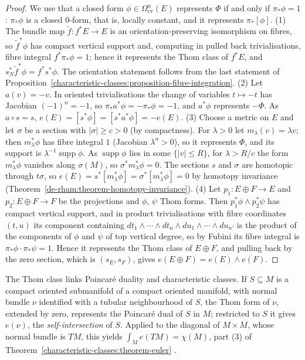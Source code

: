 \begin{proof}
We use that a closed form $\phi \in \Omega^n_{\mathrm{cv}}(E)$ represents $\Phi$ if and only if $\pi_*\phi = 1$: $\pi_*\phi$ is a closed $0$-form, that is, locally constant, and it represents $\pi_*[\phi]$. (1) The bundle map
$\tilde f \colon f^*E \to E$ is an orientation-preserving isomorphism on fibres, so $\tilde f^*\phi$ has compact vertical support and, computing in pulled back trivialisations, fibre integral $f^*\pi_*\phi = 1$; hence it represents
the Thom class of $f^*E$, and $s_N^*\tilde f^*\phi = f^*s^*\phi$. The orientation statement follows from the last statement of Proposition~\ref{characteristic-classes:proposition-fibre-integration}.
(2) Let $a(v) = -v$. In oriented trivialisations the change of variables $t \mapsto -t$ has Jacobian $(-1)^n = -1$, so $\pi_*a^*\phi = -\pi_*\phi = -1$, and $a^*\phi$ represents $-\Phi$. As $a \circ s = s$,
$e(E) = [s^*\phi] = [s^*a^*\phi] = -e(E)$.
(3) Choose a metric on $E$ and let $\sigma$ be a section with $|\sigma| \geq c > 0$ (by compactness). For $\lambda > 0$ let $m_\lambda(v) = \lambda v$; then $m_\lambda^*\phi$ has fibre integral $1$ (Jacobian $\lambda^n > 0$), so it represents $\Phi$, and its support is
$\lambda^{-1}\operatorname{supp}\phi$. As $\operatorname{supp}\phi$ lies in some $\{|v| \leq R\}$, for $\lambda > R/c$ the form $m_\lambda^*\phi$ vanishes along $\sigma(M)$, so $\sigma^*m_\lambda^*\phi = 0$. The sections $s$ and $\sigma$ are homotopic
through $t\sigma$, so $e(E) = s^*[m_\lambda^*\phi] = \sigma^*[m_\lambda^*\phi] = 0$ by homotopy invariance (Theorem~\ref{de-rham:theorem-homotopy-invariance}).
(4) Let $p_1 \colon E \oplus F \to E$ and $p_2 \colon E \oplus F \to F$ be the projections and $\phi$, $\psi$ Thom forms. Then $p_1^*\phi \wedge p_2^*\psi$ has compact vertical support, and in product trivialisations with fibre coordinates
$(t, u)$ its component containing $dt_1 \wedge \cdots \wedge dt_n \wedge du_1 \wedge \cdots \wedge du_{n'}$ is the product of the components of $\phi$ and $\psi$ of top vertical degree, so by Fubini its fibre integral is
$\pi_*\phi \cdot \pi_*\psi = 1$. Hence it represents the Thom class of $E \oplus F$, and pulling back by the zero section, which is $(s_E, s_F)$, gives $e(E \oplus F) = e(E) \wedge e(F)$.
\end{proof}

\begin{remark}\label{characteristic-classes:remark-thom-poincare-dual}
The Thom class links Poincar\'e duality and characteristic classes. If $S \subseteq M$ is a compact oriented submanifold of a compact oriented manifold, with normal bundle $\nu$ identified with a tubular neighbourhood of $S$, the
Thom form of $\nu$, extended by zero, represents the Poincar\'e dual of $S$ in $M$; restricted to $S$ it gives $e(\nu)$, the \emph{self-intersection} of $S$. Applied to the diagonal of $M \times M$, whose normal bundle is $TM$, this
yields $\int_Me(TM) = \chi(M)$, part (3) of Theorem~\ref{characteristic-classes:theorem-euler} \cite{bott-tu}.
\end{remark}

